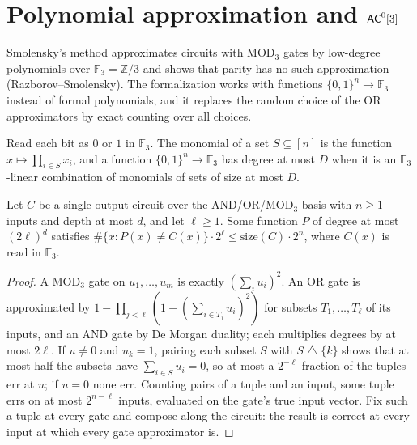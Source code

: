 \section{Polynomial approximation and $\mathsf{AC}^0[3]$}
\label{sec:lowerbounds-smolensky}

Smolensky's method approximates circuits with $\mathrm{MOD}_3$ gates by
low-degree polynomials over $\mathbb{F}_3 = \mathbb{Z}/3$ and shows that parity
has no such approximation (Razborov--Smolensky). The formalization works with
functions $\{0,1\}^n \to \mathbb{F}_3$ instead of formal polynomials, and it
replaces the random choice of the OR approximators by exact counting over all
choices.

\begin{definition}
  \label{def:lowerbounds-smolensky-low-degree}
  \leanok
  Read each bit as $0$ or $1$ in $\mathbb{F}_3$. The monomial of a set
  $S \subseteq [n]$ is the function $x \mapsto \prod_{i \in S} x_i$, and a
  function $\{0,1\}^n \to \mathbb{F}_3$ has degree at most $D$ when it is an
  $\mathbb{F}_3$-linear combination of monomials of sets of size at most $D$.
\end{definition}

\begin{theorem}
  \label{thm:lowerbounds-smolensky-approximation}
  \leanok
  Let $C$ be a single-output circuit over the AND/OR/$\mathrm{MOD}_3$ basis with
  $n \ge 1$ inputs and depth at most $d$, and let $\ell \ge 1$. Some function
  $P$ of degree at most $(2\ell)^d$ satisfies
  $\#\{x : P(x) \ne C(x)\} \cdot 2^\ell \le \mathrm{size}(C) \cdot 2^n$, where
  $C(x)$ is read in $\mathbb{F}_3$.
\end{theorem}
\begin{proof}
  \leanok
  A $\mathrm{MOD}_3$ gate on $u_1, \dots, u_m$ is exactly $(\sum_i u_i)^2$. An OR
  gate is approximated by $1 - \prod_{j < \ell} (1 - (\sum_{i \in T_j} u_i)^2)$
  for subsets $T_1, \dots, T_\ell$ of its inputs, and an AND gate by De Morgan
  duality; each multiplies degrees by at most $2\ell$. If $u \ne 0$ and
  $u_k = 1$, pairing each subset $S$ with $S \mathbin{\triangle} \{k\}$ shows that
  at most half the subsets have $\sum_{i \in S} u_i = 0$, so at most a
  $2^{-\ell}$ fraction of the tuples err at $u$; if $u = 0$ none err. Counting
  pairs of a tuple and an input, some tuple errs on at most $2^{n - \ell}$
  inputs, evaluated on the gate's true input vector. Fix such a tuple at every
  gate and compose along the circuit: the result is correct at every input at
  which every gate approximator is.
\end{proof}

